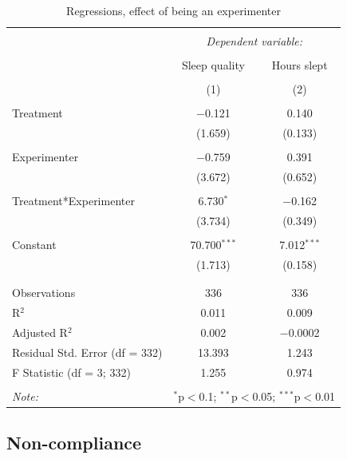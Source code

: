 \documentclass[12pt,]{article}
\begin{document}
\begin{table}[!htbp] \centering 
  \caption{\label{tab:experimenter_regression} Regressions, effect of being an experimenter} 
  \label{} 
\begin{tabular}{@{\extracolsep{5pt}}lcc} 
\\[-1.8ex]\hline 
\hline \\[-1.8ex] 
 & \multicolumn{2}{c}{\textit{Dependent variable:}} \\ 
\cline{2-3} 
\\[-1.8ex] & Sleep quality & Hours slept \\ 
\\[-1.8ex] & (1) & (2)\\ 
\hline \\[-1.8ex] 
 Treatment & $-$0.121 & 0.140 \\ 
  & (1.659) & (0.133) \\ 
  & & \\ 
 Experimenter & $-$0.759 & 0.391 \\ 
  & (3.672) & (0.652) \\ 
  & & \\ 
 Treatment*Experimenter & 6.730$^{*}$ & $-$0.162 \\ 
  & (3.734) & (0.349) \\ 
  & & \\ 
 Constant & 70.700$^{***}$ & 7.012$^{***}$ \\ 
  & (1.713) & (0.158) \\ 
  & & \\ 
\hline \\[-1.8ex] 
Observations & 336 & 336 \\ 
R$^{2}$ & 0.011 & 0.009 \\ 
Adjusted R$^{2}$ & 0.002 & $-$0.0002 \\ 
Residual Std. Error (df = 332) & 13.393 & 1.243 \\ 
F Statistic (df = 3; 332) & 1.255 & 0.974 \\ 
\hline 
\hline \\[-1.8ex] 
\textit{Note:}  & \multicolumn{2}{r}{$^{*}$p$<$0.1; $^{**}$p$<$0.05; $^{***}$p$<$0.01} \\ 
\end{tabular} 
\end{table}

\hypertarget{non-compliance}{%
\subsection{Non-compliance}\label{non-compliance}}
\end{document}
